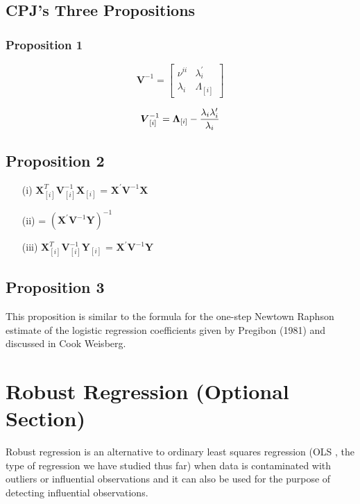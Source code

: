 \subsection{CPJ's Three Propositions} %


\subsubsection{Proposition 1}

\[
\boldsymbol{V}^{-1} =
\left[ \begin{array}{cc}
\nu^{ii} & \lambda_{i}^{\prime}  \\
\lambda_{i} & \Lambda_{[i]}
\end{array}\right] \]


\[\boldsymbol{V}_{[i]}^{-1} = \boldsymbol{\Lambda}_{[i]} - { \lambda_{i} \lambda_{i} ^{\prime} \over \lambda_{i} } \]

\subsection{Proposition 2}

\begin{itemize}
\item[(i)] $ \boldsymbol{X}_{[i]}^{T}\boldsymbol{V}^{-1}_{[i]}\boldsymbol{X}_{[i]}$ = $\boldsymbol{X}^{\prime}\boldsymbol{V}^{-1}\boldsymbol{X}$
\item[(ii)] = $(\boldsymbol{X}^{\prime}\boldsymbol{V}^{-1}\boldsymbol{Y})^{-1}$
\item[(iii)] $ \boldsymbol{X}_{[i]}^{T}\boldsymbol{V}^{-1}_{[i]}\boldsymbol{Y}_{[i]}$ = $\boldsymbol{X}^{\prime}\boldsymbol{V}^{-1}\boldsymbol{Y}$
\end{itemize}
\subsection{Proposition 3}
This proposition is similar to the formula for the one-step Newtown Raphson estimate of the logistic regression coefficients given by Pregibon (1981) and discussed in Cook Weisberg.
\newpage
\newpage
\section{Robust Regression (Optional Section)}

Robust regression is an alternative to ordinary least squares regression (OLS , the type of regression we have studied thus far) when data is contaminated with outliers or influential observations and it can also be used for the purpose of detecting influential observations.


